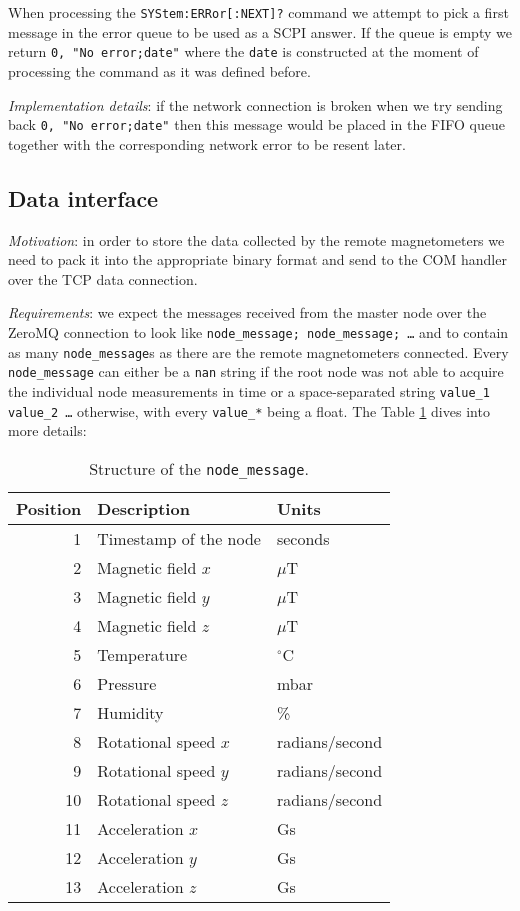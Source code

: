 When processing the  \texttt{SYStem:ERRor[:NEXT]?} command we attempt to pick a first message in the error queue to be used as a SCPI answer. If the queue is empty we return \texttt{0, "No error;date"} where the \texttt{date} is constructed at the moment of processing the command as it was defined before.

\textit{Implementation details}: if the network connection is broken when we try sending back \texttt{0, "No error;date"} then this message would be placed in the FIFO queue together with the corresponding network error to be resent later.

\subsection{Data interface}
\label{subsec:rm-proxy_data}

\textit{Motivation}: in order to store the data collected by the remote magnetometers we need to pack it into the appropriate \cite{Bison2018} binary format and send to the COM handler over the TCP data connection.

\textit{Requirements}: we expect the messages received from the master node over the ZeroMQ connection to look like \texttt{node\_message; node\_message; \ldots} and to contain as many \texttt{node\_message}s as there are the remote magnetometers connected. Every \texttt{node\_message} can either be a \texttt{nan} string if the root node was not able to acquire the individual node measurements in time or a space-separated string \texttt{value\_1 value\_2 \ldots} otherwise, with every \texttt{value\_*} being a float. The Table \ref{tbl:node_message} dives into more details:

\begin{table}[h]
\centering
\begin{tabular}{|r|l|l|}
	\hline
	Position & Description & Units \\
	\hline \hline
	1 & Timestamp of the node & seconds \\
	\hline
	2 & Magnetic field $x$ & $\mu$T \\
	\hline
	3 & Magnetic field $y$ & $\mu$T \\
	\hline
	4 & Magnetic field $z$ & $\mu$T \\
	\hline
	5 & Temperature & $^\circ$C \\
	\hline
	6 & Pressure & mbar \\
	\hline
	7 & Humidity & \% \\
	\hline
	8 & Rotational speed $x$ & radians/second \\
	\hline
	9 & Rotational speed $y$ & radians/second \\
	\hline
	10 & Rotational speed $z$ & radians/second \\
	\hline
	11 & Acceleration $x$ & Gs \\
	\hline
	12 & Acceleration $y$ & Gs \\
	\hline
	13 & Acceleration $z$ & Gs \\
	\hline
\end{tabular}
\caption{Structure of the \texttt{node\_message}.}
\label{tbl:node_message}
\end{table}

